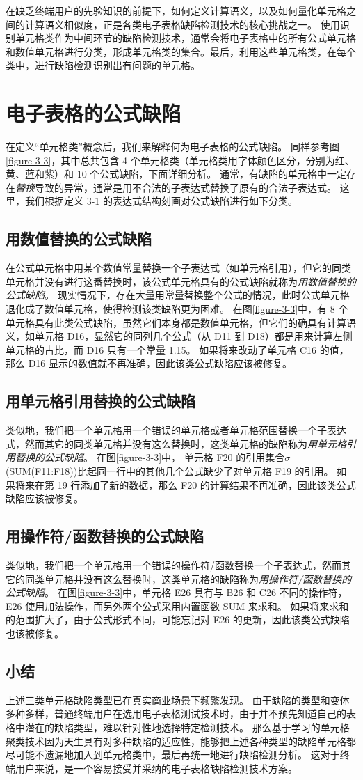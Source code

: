 在缺乏终端用户的先验知识的前提下，如何定义计算语义，以及如何量化单元格之间的计算语义相似度，正是各类电子表格缺陷检测技术的核心挑战之一\cite{Barowy2018excelint}。
使用识别单元格类作为中间环节的缺陷检测技术，通常会将电子表格中的所有公式单元格和数值单元格进行分类，形成单元格类的集合。最后，利用这些单元格类，在每个类中，进行缺陷检测识别出有问题的单元格。


\section{电子表格的公式缺陷}
在定义“单元格类”概念后，我们来解释何为电子表格的公式缺陷。
同样参考图\ref{figure-3-3}，其中总共包含 4 个单元格类（单元格类用字体颜色区分，分别为红、黄、蓝和紫）和 10 个公式缺陷，下面详细分析。
通常，有缺陷的单元格中一定存在\textit{替换}导致的异常，通常是用不合法的子表达式替换了原有的合法子表达式。
这里，我们根据定义 3-1 的表达式结构刻画对公式缺陷进行如下分类。

\subsection{用数值替换的公式缺陷}
在公式单元格中用某个数值常量替换一个子表达式（如单元格引用），但它的同类单元格并没有进行这番替换时，该公式单元格具有的公式缺陷就称为\textit{用数值替换的公式缺陷}。
现实情况下，存在大量用常量替换整个公式的情况，此时公式单元格退化成了数值单元格，使得检测该类缺陷更为困难。
在图\ref{figure-3-3}中，有 8 个单元格具有此类公式缺陷，虽然它们本身都是数值单元格，但它们的确具有计算语义，如单元格 D16，显然它的同列几个公式（从 D11 到 D18）都是用来计算左侧单元格的占比，而 D16 只有一个常量 1.15。
如果将来改动了单元格 C16 的值，那么 D16 显示的数值就不再准确，因此该类公式缺陷应该被修复。

\subsection{用单元格引用替换的公式缺陷}
类似地，我们把一个单元格用一个错误的单元格或者单元格范围替换一个子表达式，然而其它的同类单元格并没有这么替换时，这类单元格的缺陷称为\textit{用单元格引用替换的公式缺陷}。
在图\ref{figure-3-3}中， 单元格 F20 的引用集合$\sigma$(SUM(F11:F18))比起同一行中的其他几个公式缺少了对单元格 F19 的引用。
如果将来在第 19 行添加了新的数据，那么 F20 的计算结果不再准确，因此该类公式缺陷应该被修复。

\subsection{用操作符/函数替换的公式缺陷}
类似地，我们把一个单元格用一个错误的操作符/函数替换一个子表达式，然而其它的同类单元格并没有这么替换时，这类单元格的缺陷称为\textit{用操作符/函数替换的公式缺陷}。
在图\ref{figure-3-3}中，单元格 E26 具有与 B26 和 C26 不同的操作符，E26 使用加法操作，而另外两个公式采用内置函数 SUM 来求和。
如果将来求和的范围扩大了，由于公式形式不同，可能忘记对 E26 的更新，因此该类公式缺陷也该被修复。

\subsection{小结}
上述三类单元格缺陷类型已在真实商业场景下频繁发现\cite{panko2006facing,powell2008critical}。
由于缺陷的类型和变体多种多样，普通终端用户在选用电子表格测试技术时，由于并不预先知道自己的表格中潜在的缺陷类型，难以针对性地选择特定检测技术。
那么基于学习的单元格聚类技术因为天生具有对多种缺陷的适应性，能够把上述各种类型的缺陷单元格都尽可能不遗漏地加入到单元格类中，最后再统一地进行缺陷检测分析。
这对于终端用户来说，是一个容易接受并采纳的电子表格缺陷检测技术方案。